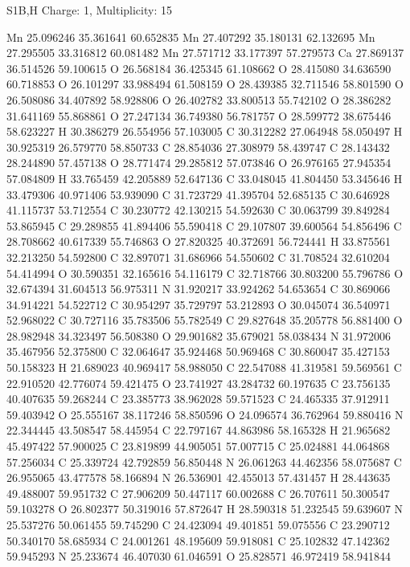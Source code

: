 \documentclass{article}
\begin{document}
S1B,H   Charge: 1, Multiplicity: 15    
   
Mn 25.096246 35.361641 60.652835
Mn 27.407292 35.180131 62.132695
Mn 27.295505 33.316812 60.081482
Mn 27.571712 33.177397 57.279573
Ca 27.869137 36.514526 59.100615
O 26.568184 36.425345 61.108662
O 28.415080 34.636590 60.718853
O 26.101297 33.988494 61.508159
O 28.439385 32.711546 58.801590
O 26.508086 34.407892 58.928806
O 26.402782 33.800513 55.742102
O 28.386282 31.641169 55.868861
O 27.247134 36.749380 56.781757
O 28.599772 38.675446 58.623227
H 30.386279 26.554956 57.103005
C 30.312282 27.064948 58.050497
H 30.925319 26.579770 58.850733
C 28.854036 27.308979 58.439747
C 28.143432 28.244890 57.457138
O 28.771474 29.285812 57.073846
O 26.976165 27.945354 57.084809
H 33.765459 42.205889 52.647136
C 33.048045 41.804450 53.345646
H 33.479306 40.971406 53.939090
C 31.723729 41.395704 52.685135
C 30.646928 41.115737 53.712554
C 30.230772 42.130215 54.592630
C 30.063799 39.849284 53.865945
C 29.289855 41.894406 55.590418
C 29.107807 39.600564 54.856496
C 28.708662 40.617339 55.746863
O 27.820325 40.372691 56.724441
H 33.875561 32.213250 54.592800
C 32.897071 31.686966 54.550602
C 31.708524 32.610204 54.414994
O 30.590351 32.165616 54.116179
C 32.718766 30.803200 55.796786
O 32.674394 31.604513 56.975311
N 31.920217 33.924262 54.653654
C 30.869066 34.914221 54.522712
C 30.954297 35.729797 53.212893
O 30.045074 36.540971 52.968022
C 30.727116 35.783506 55.782549
C 29.827648 35.205778 56.881400
O 28.982948 34.323497 56.508380
O 29.901682 35.679021 58.038434
N 31.972006 35.467956 52.375800
C 32.064647 35.924468 50.969468
C 30.860047 35.427153 50.158323
H 21.689023 40.969417 58.988050
C 22.547088 41.319581 59.569561
C 22.910520 42.776074 59.421475
O 23.741927 43.284732 60.197635
C 23.756135 40.407635 59.268244
C 23.385773 38.962028 59.571523
C 24.465335 37.912911 59.403942
O 25.555167 38.117246 58.850596
O 24.096574 36.762964 59.880416
N 22.344445 43.508547 58.445954
C 22.797167 44.863986 58.165328
H 21.965682 45.497422 57.900025
C 23.819899 44.905051 57.007715
C 25.024881 44.064868 57.256034
C 25.339724 42.792859 56.850448
N 26.061263 44.462356 58.075687
C 26.955065 43.477578 58.166894
N 26.536901 42.455013 57.431457
H 28.443635 49.488007 59.951732
C 27.906209 50.447117 60.002688
C 26.707611 50.300547 59.103278
O 26.802377 50.319016 57.872647
H 28.590318 51.232545 59.639607
N 25.537276 50.061455 59.745290
C 24.423094 49.401851 59.075556
C 23.290712 50.340170 58.685934
C 24.001261 48.195609 59.918081
C 25.102832 47.142362 59.945293
N 25.233674 46.407030 61.046591
O 25.828571 46.972419 58.941844
\end{document}
